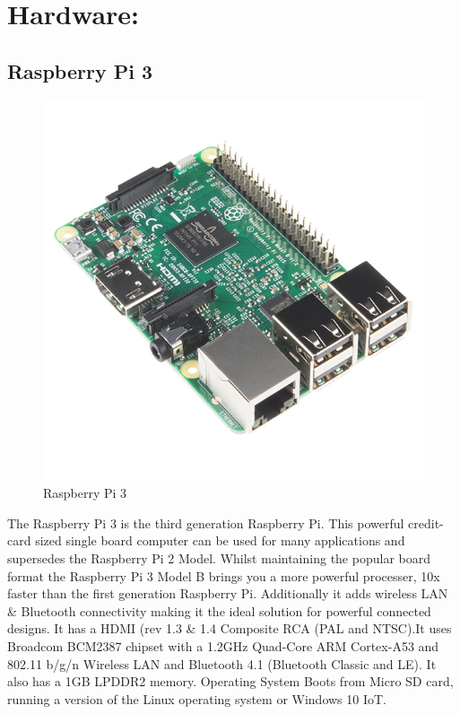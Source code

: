 \chapter{Hardware:}
\section{Raspberry Pi 3}{
	\begin{figure}[H]
		\includegraphics[scale=2]{images/rpi.jpg}
		\centering
		\caption{Raspberry Pi 3}
		\label{trans}
	\end{figure}
	The Raspberry Pi 3 is the third generation Raspberry Pi. This powerful
    credit-card sized single board computer can be used for many applications
    and supersedes the Raspberry Pi 2 Model. Whilst maintaining the popular board format the Raspberry Pi 3 Model
    B brings you a more powerful processer, 10x faster than the first generation
    Raspberry Pi. Additionally it adds wireless LAN & Bluetooth connectivity
    making it the ideal solution for powerful connected designs. It has a HDMI (rev 1.3 & 1.4 Composite RCA (PAL and NTSC).It uses Broadcom BCM2387 chipset with a
    1.2GHz Quad-Core ARM Cortex-A53 and 802.11 b/g/n Wireless LAN and Bluetooth 4.1 (Bluetooth Classic and LE). It also has a 1GB LPDDR2 memory. Operating System Boots from Micro SD card, running a version of the Linux operating system or
    Windows 10 IoT.
	
}
